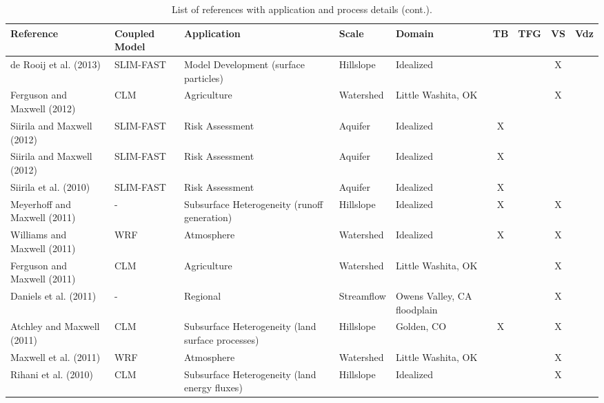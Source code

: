 {\begin{table} \center
\renewcommand{\arraystretch}{2.5}
\center
\caption{List of \parflow{} references with application and process details (cont.).}

\begin{tabular}{ l  p{1.5cm} p{2cm} p{1.5cm} p{1.5cm} | c | c | c | c }
\bf{Reference} & \bf{Coupled Model} & \bf{Application} & \bf{Scale} & \bf{Domain} & \bf{TB} & \bf{TFG} & \bf{VS} & \bf{Vdz} \\   
\hline{}
   
\cite{deRooij13} de Rooij et al. (2013) & SLIM-FAST & Model Development (surface particles) & Hillslope & Idealized  &   &   & X &     \\
\cite{Ferg12} Ferguson and Maxwell (2012) & CLM & Agriculture & Watershed & Little Washita, OK  &   &   & X &     \\
\cite{Siirila12a} Siirila and Maxwell (2012) & SLIM-FAST & Risk Assessment & Aquifer & Idealized  & X &   &   &     \\
\cite{Siirila12b} Siirila and Maxwell (2012) & SLIM-FAST & Risk Assessment & Aquifer & Idealized  & X &   &   &     \\
\cite{SNSMM10} Siirila et al. (2010) & SLIM-FAST & Risk Assessment & Aquifer & Idealized  & X &   &   &     \\
\cite{Meyerhoff11} Meyerhoff and Maxwell (2011) & - & Subsurface Heterogeneity (runoff generation) & Hillslope  & Idealized  & X &   & X &     \\
\cite{Williams11} Williams and Maxwell (2011) & WRF & Atmosphere & Watershed & Idealized & X &   & X &     \\
\cite{Ferg11} Ferguson and Maxwell (2011) & CLM & Agriculture & Watershed & Little Washita, OK  &   &   & X &     \\
\cite{DMC10} Daniels et al. (2011) & - & Regional & Streamflow & Owens Valley, CA floodplain  &   &   & X &     \\
\cite{AM10} Atchley and Maxwell (2011) & CLM & Subsurface Heterogeneity (land surface processes) & Hillslope & Golden, CO  & X &   & X &     \\
\cite{MLMSWT10} Maxwell et al. (2011) & WRF & Atmosphere & Watershed  & Little Washita, OK  &   &   & X &     \\
\cite{RMC10} Rihani et al. (2010) & CLM & Subsurface Heterogeneity (land energy fluxes) & Hillslope & Idealized  &   &   & X &     \\
\end{tabular}
\label{pfref2}
\end{table}

}
